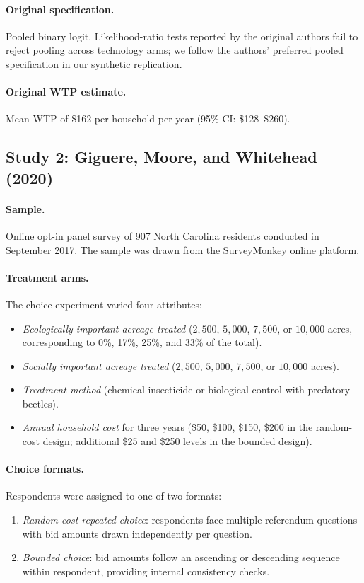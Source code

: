 \documentclass[12pt]{article}
\begin{document}
\paragraph{Original specification.} Pooled binary logit. Likelihood-ratio tests reported by the original authors fail to reject pooling across technology arms; we follow the authors' preferred pooled specification in our synthetic replication.

\paragraph{Original WTP estimate.} Mean WTP of \$162 per household per year (95\% CI: \$128--\$260).

\subsection{Study 2: Giguere, Moore, and Whitehead (2020)}

\paragraph{Sample.} Online opt-in panel survey of 907 North Carolina residents conducted in September 2017. The sample was drawn from the SurveyMonkey online platform.

\paragraph{Treatment arms.} The choice experiment varied four attributes:
\begin{itemize}[noitemsep]
    \item \textit{Ecologically important acreage treated} ($2{,}500$, $5{,}000$, $7{,}500$, or $10{,}000$ acres, corresponding to 0\%, 17\%, 25\%, and 33\% of the total).
    \item \textit{Socially important acreage treated} ($2{,}500$, $5{,}000$, $7{,}500$, or $10{,}000$ acres).
    \item \textit{Treatment method} (chemical insecticide or biological control with predatory beetles).
    \item \textit{Annual household cost} for three years (\$50, \$100, \$150, \$200 in the random-cost design; additional \$25 and \$250 levels in the bounded design).
\end{itemize}

\paragraph{Choice formats.} Respondents were assigned to one of two formats:
\begin{enumerate}[noitemsep]
    \item \textit{Random-cost repeated choice}: respondents face multiple referendum questions with bid amounts drawn independently per question.
    \item \textit{Bounded choice}: bid amounts follow an ascending or descending sequence within respondent, providing internal consistency checks.
\end{enumerate}
\end{document}
